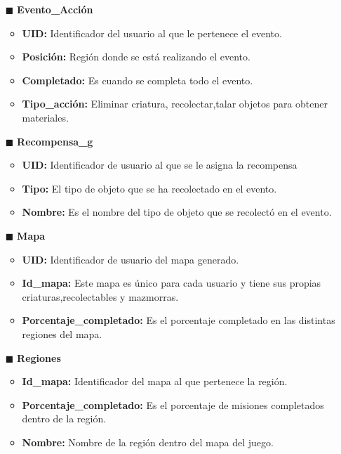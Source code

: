 \documentclass{report}
\begin{document}
\begin{itemize}
    \item[$\blacksquare$]\textbf{Evento\_Acción}
        \begin{itemize}
            \item \textbf{UID:} Identificador del usuario al que le pertenece el evento.
            \item \textbf{Posición:} Región donde se está realizando el evento.
            \item \textbf{Completado:} Es cuando se completa todo el evento.
            \item \textbf{Tipo\_acción:} Eliminar criatura, recolectar,talar objetos para obtener materiales.  
        \end{itemize}
    \item[$\blacksquare$]\textbf{Recompensa\_g}
        \begin{itemize}
            \item \textbf{UID:} Identificador de usuario al que se le asigna la recompensa
            \item \textbf{Tipo:} El tipo de objeto que se ha recolectado en el evento.
            \item \textbf{Nombre:} Es el nombre del tipo de objeto que se recolectó en el evento.
        \end{itemize}
    \item[$\blacksquare$]\textbf{Mapa}
        \begin{itemize}
            \item \textbf{UID:} Identificador de usuario del mapa generado.
            \item \textbf{Id\_mapa:} Este mapa es único para cada usuario y tiene sus propias criaturas,recolectables y mazmorras.
            \item \textbf{Porcentaje\_completado:} Es el porcentaje completado en las distintas regiones del mapa.
        \end{itemize}
    \item[$\blacksquare$]\textbf{Regiones}
        \begin{itemize}
            \item \textbf{Id\_mapa:} Identificador del mapa al que pertenece la región.
            \item \textbf{Porcentaje\_completado:} Es el porcentaje de misiones completados dentro de la región.
            \item \textbf{Nombre:} Nombre de la región dentro del mapa del juego.
        \end{itemize}

\end{itemize}
\end{document}
